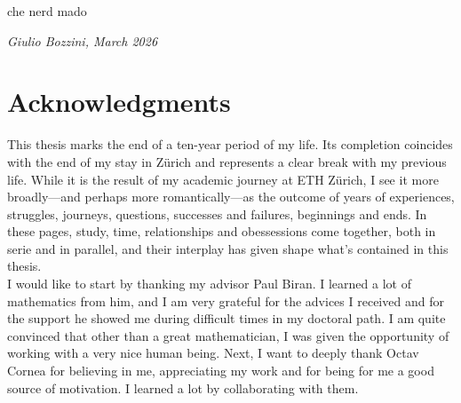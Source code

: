 
\newpage 
\thispagestyle{empty}
\epigraph{che nerd mado}{\textit{Giulio Bozzini, March 2026}}

\newpage

\chapter*{Acknowledgments}

This thesis marks the end of a ten-year period of my life. Its completion coincides with the end of my stay in Zürich and represents a clear break with my previous life. While it is the result of my academic journey at ETH Zürich, I see it more broadly—and perhaps more romantically—as the outcome of years of experiences, struggles, journeys, questions, successes and failures, beginnings and ends. In these pages, study, time, relationships and obessessions come together, both in serie and in parallel, and their interplay has given shape what's contained in this thesis.\\

I would like to start by thanking my advisor Paul Biran. I learned a lot of mathematics from him, and I am very grateful for the advices I received and for the support he showed me during difficult times in my doctoral path. I am quite convinced that other than a great mathematician, I was given the opportunity of working with a very nice human being. Next, I want to deeply thank Octav Cornea for believing in me, appreciating my work and for being for me a good source of motivation. I learned a lot by collaborating with them.




